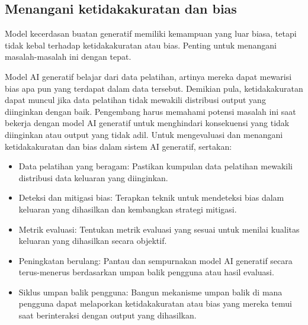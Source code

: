 \documentclass{article}
\begin{document}
\subsection{Menangani ketidakakuratan dan bias}
Model kecerdasan buatan generatif memiliki kemampuan yang luar biasa, tetapi tidak kebal terhadap ketidakakuratan atau bias. Penting untuk menangani masalah-masalah ini dengan tepat.

Model AI generatif belajar dari data pelatihan, artinya mereka dapat mewarisi bias apa pun yang terdapat dalam data tersebut. Demikian pula, ketidakakuratan dapat muncul jika data pelatihan tidak mewakili distribusi output yang diinginkan dengan baik. Pengembang harus memahami potensi masalah ini saat bekerja dengan model AI generatif untuk menghindari konsekuensi yang tidak diinginkan atau output yang tidak adil. Untuk mengevaluasi dan menangani ketidakakuratan dan bias dalam sistem AI generatif, sertakan:
\begin{itemize}
    \item Data pelatihan yang beragam: Pastikan kumpulan data pelatihan mewakili distribusi data keluaran yang diinginkan.
    \item Deteksi dan mitigasi bias: Terapkan teknik untuk mendeteksi bias dalam keluaran yang dihasilkan dan kembangkan strategi mitigasi.
    \item Metrik evaluasi: Tentukan metrik evaluasi yang sesuai untuk menilai kualitas keluaran yang dihasilkan secara objektif.
    \item Peningkatan berulang: Pantau dan sempurnakan model AI generatif secara terus-menerus berdasarkan umpan balik pengguna atau hasil evaluasi.
    \item Siklus umpan balik pengguna: Bangun mekanisme umpan balik di mana pengguna dapat melaporkan ketidakakuratan atau bias yang mereka temui saat berinteraksi dengan output yang dihasilkan.
\end{itemize}
\end{document}
